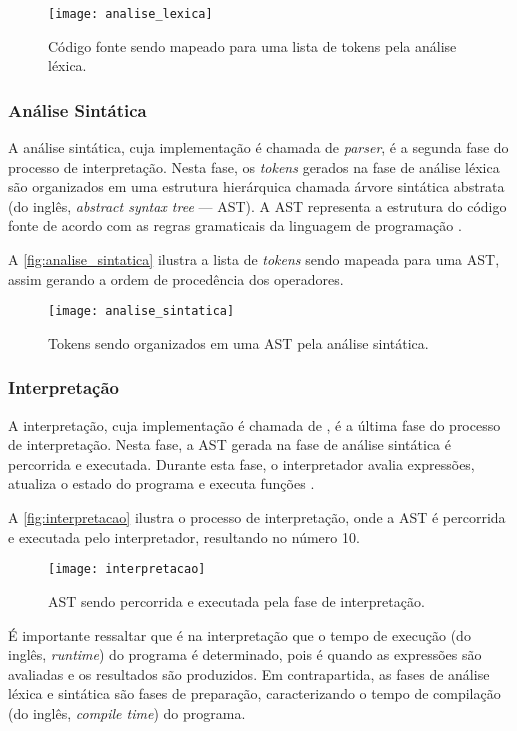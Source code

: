 \begin{figure}[H]
	\centering
	\texttt{[image: analise\_lexica]}
	\caption{Código fonte sendo mapeado para uma lista de tokens pela análise léxica.}
	\label{fig:analise_lexica}
\end{figure}

\subsubsection{Análise Sintática}

A análise sintática, cuja implementação é chamada de \textit{parser}, é a segunda fase do processo de interpretação. Nesta fase, os \textit{tokens} gerados na fase de análise léxica são organizados em uma estrutura hierárquica chamada árvore sintática abstrata (do inglês, \textit{abstract syntax tree} — AST). A AST representa a estrutura do código fonte de acordo com as regras gramaticais da linguagem de programação \cite{craftinginterpreters}.

A \autoref{fig:analise_sintatica} ilustra a lista de \textit{tokens} sendo mapeada para uma AST, assim gerando a ordem de procedência dos operadores.

\begin{figure}[H]
	\centering
	\texttt{[image: analise\_sintatica]}
	\caption{Tokens sendo organizados em uma AST pela análise sintática.}
	\label{fig:analise_sintatica}
\end{figure}

\subsubsection{Interpretação}

A interpretação, cuja implementação é chamada de \cite{interpreter}, é a última fase do processo de interpretação. Nesta fase, a AST gerada na fase de análise sintática é percorrida e executada. Durante esta fase, o interpretador avalia expressões, atualiza o estado do programa e executa funções \cite{craftinginterpreters}.

A \autoref{fig:interpretacao} ilustra o processo de interpretação, onde a AST é percorrida e executada pelo interpretador, resultando no número 10.

\begin{figure}[H]
	\centering
	\texttt{[image: interpretacao]}
	\caption{AST sendo percorrida e executada pela fase de interpretação.}
	\label{fig:interpretacao}
\end{figure}

É importante ressaltar que é na interpretação que o tempo de execução (do inglês, \textit{runtime}) do programa é determinado, pois é quando as expressões são avaliadas e os resultados são produzidos. Em contrapartida, as fases de análise léxica e sintática são fases de preparação, caracterizando o tempo de compilação (do inglês, \textit{compile time}) do programa.
